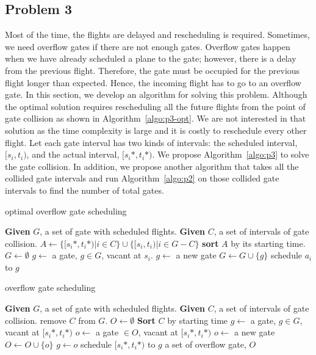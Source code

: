 \documentclass[11pt,a4paper]{article}
\begin{document}
\subsection{Problem 3}
\label{subsec:algo-prob3}
Most of the time, the flights are delayed and rescheduling is required. Sometimes, we need overflow gates if there are not enough gates. Overflow gates happen when we have already scheduled a plane to the gate; however, there is a delay from the previous flight. Therefore, the gate must be occupied for the previous flight longer than expected. Hence, the incoming flight has to go to an overflow gate. In this section, we develop an algorithm for solving this problem. Although the optimal solution requires rescheduling all the future flights from the point of gate collision as shown in Algorithm~\ref{algo:p3-opt}. We are not interested in that solution as the time complexity is large and it is costly to reschedule every other flight. Let each gate interval has two kinds of intervals: the scheduled interval, $[s_i, t_i)$, and the actual interval, $[s_i*, t_i*)$. We propose Algorithm~\ref{algo:p3} to solve the gate collision. In addition, we propose another algorithm that takes all the collided gate intervals and run Algorithm~\ref{algo:p2} on those collided gate intervals to find the number of total gates.\par

\begin{algorithm}
\caption{optimal overflow gate scheduling}
\label{algo:p3-opt}
\begin{algorithmic}
\STATE \textbf{Given} $G$, a set of gate with scheduled flights.
\STATE \textbf{Given} $C$, a set of intervals of gate collision.
\STATE $A \gets \{[s_i*, t_i*) | i \in C\} \cup \{[s_i, t_i) | i \in G-C\}$
\STATE \textbf{sort} $A$ by its starting time.
\STATE $G \gets \emptyset$
	\STATE $g \gets $ a gate, $g \in G$, vacant at $s_i$.
		\STATE $g \gets$ a new gate \label{algo:p2:newGate}
		\STATE $G \gets G \cup \{g\}$
	\ENDIF
	\STATE schedule $a_i$ to $g$ \label{algo:p2:schedule}
\ENDFOR
\end{algorithmic}
\end{algorithm}

\begin{algorithm}
\caption{overflow gate scheduling}\label{algo:p3}
\begin{algorithmic}
\STATE \textbf{Given} $G$, a set of gate with scheduled flights.
\STATE \textbf{Given} $C$, a set of intervals of gate collision.
\STATE remove $C$ from $G$.
\STATE $O \gets \emptyset$
\STATE \textbf{Sort} $C$ by starting time
\FORALL{$[s_i*, t_i*)$ in $C$}
	\STATE $g \gets $ a gate, $g \in G$, vacant at $[s_i*, t_i*)$
		\STATE $o \gets $ a gate $\in O$, vacant at $[s_i*, t_i*)$
			\STATE $o \gets$ a new gate
			\STATE $O \gets O \cup \{o\}$
		\ENDIF
		\STATE $g \gets o$
	\ENDIF
	\STATE schedule $[s_i*, t_i*)$ to $g$
\ENDFOR
\RETURN a set of overflow gate, $O$
\end{algorithmic}
\end{algorithm}
\end{document}
